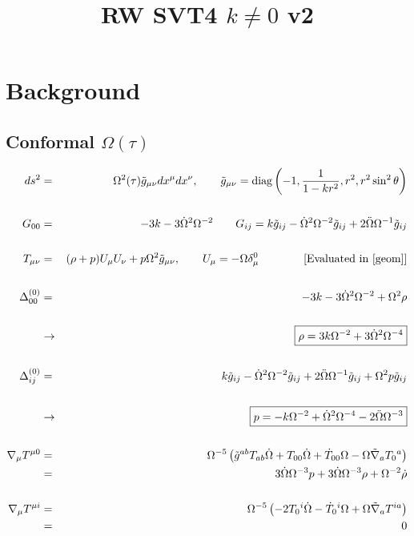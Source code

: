 \documentclass[10pt,letterpaper]{article}
\title{RW SVT4 $k\ne 0$ v2}
\date{}
\numberwithin{equation}{section}
\begin{document}
 
\maketitle
\noindent 
\section{Background}

\subsection{Conformal $\Omega(\tau)$}
\begin{eqnarray}
ds^2 &=& \Omega^2(\tau)\tilde g_{\mu\nu} dx^\mu dx^\nu,\qquad 
\tilde g_{\mu\nu} = \text{diag}\left(-1,\frac{1}{1-kr^2},r^2,r^2\sin^2\theta\right)
\label{geom}
\\ \nonumber\\
G_{00}&=& -3k - 3 \dot\Omega^2\Omega^{-2}
\qquad
G_{ij} = k\tilde g_{ij} - \dot\Omega^2\Omega^{-2}\tilde g_{ij} + 2\ddot\Omega \Omega^{-1} \tilde g_{ij}
\\ \nonumber\\
T_{\mu\nu} &=& (\rho+p)U_\mu U_\nu + p\Omega^2 \tilde g_{\mu\nu},\qquad U_\mu = - \Omega \delta^0_\mu  \qquad\qquad  \text{[Evaluated in \eqref{geom}]}
\\ \nonumber\\
\Delta^{(0)}_{00} &=& -3k - 3 \dot\Omega^2\Omega^{-2} + \Omega^2 \rho
\\ \nonumber\\
&\to&\boxed{\rho = 3k\Omega^{-2}+3\dot\Omega^2 \Omega^{-4}}
\label{rho}
\\ \nonumber\\
\Delta^{(0)}_{ij} &=& k\tilde g_{ij} - \dot\Omega^2\Omega^{-2}\tilde g_{ij} + 2\ddot\Omega \Omega^{-1} \tilde g_{ij} + \Omega^2 p
\tilde g_{ij}
\\ \nonumber\\
&\to& \boxed{p = -k\Omega^{-2} + \dot\Omega^2\Omega^{-4} -2\ddot\Omega \Omega^{-3}}
\label{p}
\\ \nonumber\\
\nabla_\mu T^{\mu 0} &=& \Omega^{-5}\left( \tilde g^{ab} T_{ab} \dot{\Omega} + T_{00}{} \dot{\Omega} + \dot{T}_{00}{} \Omega -  \Omega \tilde{\nabla}_{a}T_{0}{}^{a}\right) 
\nonumber\\
&=& 3 \dot{\Omega}  \Omega^{-3}p + 3 \dot{\Omega}  \Omega^{-3}\rho +  \Omega^{-2}\dot{\rho}
\label{Tcons0}
\\ \nonumber\\
\nabla_\mu T^{\mu i} &=& \Omega^{-5}\left(-2 T_{0}{}^{i} \dot{\Omega} -  \dot{T}_{0}{}^{i} \Omega + \Omega \tilde{\nabla}_{a}T^{ia}\right)
\nonumber\\
&=&0
\end{eqnarray}
%
%
\end{document}
